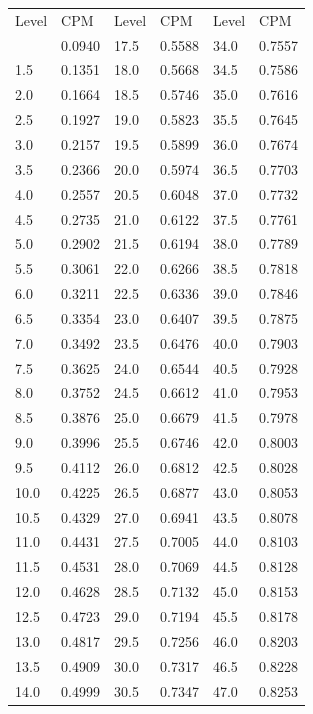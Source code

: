 \begin{table}
\begin{center}
\begin{tabular}{l l|l l|l l}
Level & CPM & Level & CPM & Level & CPM \\
\Midrule
1.0 & 0.0940 & 17.5 & 0.5588 & 34.0 & 0.7557 \\ 
1.5 & 0.1351 & 18.0 & 0.5668 & 34.5 & 0.7586 \\
2.0 & 0.1664 & 18.5 & 0.5746 & 35.0 & 0.7616 \\
2.5 & 0.1927 & 19.0 & 0.5823 & 35.5 & 0.7645 \\
3.0 & 0.2157 & 19.5 & 0.5899 & 36.0 & 0.7674 \\
3.5 & 0.2366 & 20.0 & 0.5974 & 36.5 & 0.7703 \\
4.0 & 0.2557 & 20.5 & 0.6048 & 37.0 & 0.7732 \\
4.5 & 0.2735 & 21.0 & 0.6122 & 37.5 & 0.7761 \\
5.0 & 0.2902 & 21.5 & 0.6194 & 38.0 & 0.7789 \\
5.5 & 0.3061 & 22.0 & 0.6266 & 38.5 & 0.7818 \\
6.0 & 0.3211 & 22.5 & 0.6336 & 39.0 & 0.7846 \\
6.5 & 0.3354 & 23.0 & 0.6407 & 39.5 & 0.7875 \\
7.0 & 0.3492 & 23.5 & 0.6476 & 40.0 & 0.7903 \\
7.5 & 0.3625 & 24.0 & 0.6544 & 40.5 & 0.7928 \\
8.0 & 0.3752 & 24.5 & 0.6612 & 41.0 & 0.7953 \\
8.5 & 0.3876 & 25.0 & 0.6679 & 41.5 & 0.7978 \\
9.0 & 0.3996 & 25.5 & 0.6746 & 42.0 & 0.8003 \\
9.5 & 0.4112 & 26.0 & 0.6812 & 42.5 & 0.8028 \\
10.0 & 0.4225 & 26.5 & 0.6877 & 43.0 & 0.8053 \\
10.5 & 0.4329 & 27.0 & 0.6941 & 43.5 & 0.8078 \\
11.0 & 0.4431 & 27.5 & 0.7005 & 44.0 & 0.8103 \\
11.5 & 0.4531 & 28.0 & 0.7069 & 44.5 & 0.8128 \\
12.0 & 0.4628 & 28.5 & 0.7132 & 45.0 & 0.8153 \\
12.5 & 0.4723 & 29.0 & 0.7194 & 45.5 & 0.8178 \\
13.0 & 0.4817 & 29.5 & 0.7256 & 46.0 & 0.8203 \\
13.5 & 0.4909 & 30.0 & 0.7317 & 46.5 & 0.8228 \\
14.0 & 0.4999 & 30.5 & 0.7347 & 47.0 & 0.8253 \\

\end{tabular}
\end{center}
\end{table}
